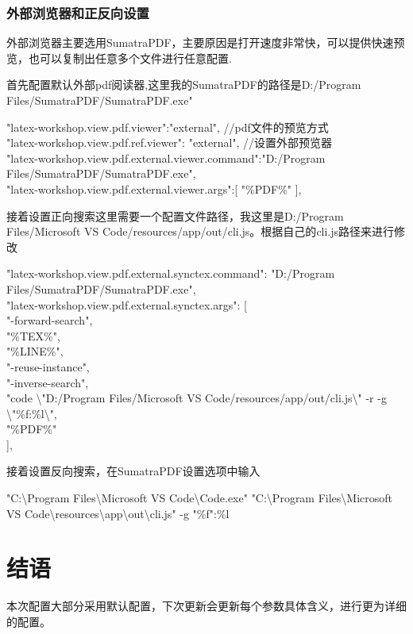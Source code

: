\documentclass[10pt, UTF8]{ctexart}%
\def\CodingInline#1{\colorbox{shadecolor}{\color{black}#1}}%
\def\CodingBlock#1{\begin{shaded} \noindent#1 \end{shaded}}
\begin{document}
        \subsubsection{外部浏览器和正反向设置}
        外部浏览器主要选用SumatraPDF，主要原因是打开速度非常快，可以提供快速预览，也可以复制出任意多个文件进行任意配置.
        
        首先配置默认外部pdf阅读器,这里我的SumatraPDF的路径是D:/Program Files/SumatraPDF/SumatraPDF.exe"
        \CodingBlock{"latex-workshop.view.pdf.viewer":"external",    //pdf文件的预览方式\\
        "latex-workshop.view.pdf.ref.viewer": "external",
        //设置外部预览器\\
        "latex-workshop.view.pdf.external.viewer.command":"D:/Program Files/SumatraPDF/SumatraPDF.exe",\\
        "latex-workshop.view.pdf.external.viewer.args":[
            "\%PDF\%"
        ],}
        接着设置正向搜索这里需要一个配置文件路径，我这里是D:/Program Files/Microsoft VS Code/resources/app/out/cli.js。根据自己的\CodingInline{cli.js}路径来进行修改
        \CodingBlock{"latex-workshop.view.pdf.external.synctex.command": "D:/Program Files/SumatraPDF/SumatraPDF.exe",\\
        "latex-workshop.view.pdf.external.synctex.args": [\\
          "-forward-search",\\
          "\%TEX\%",\\
          "\%LINE\%",\\
          "-reuse-instance",\\
          "-inverse-search",\\
          "code \textbackslash"D:/Program Files/Microsoft VS Code/resources/app/out/cli.js\textbackslash" -r -g \textbackslash"\%f:\%l\textbackslash",\\
          "\%PDF\%"\\
        ],}
        接着设置反向搜索，在SumatraPDF设置选项中输入
        \CodingBlock{"C:\textbackslash Program Files\textbackslash Microsoft VS Code\textbackslash Code.exe" "C:\textbackslash Program Files\textbackslash Microsoft VS Code\textbackslash resources\textbackslash app\textbackslash out\textbackslash cli.js" -g "\%f":\%l}

        \section{结语}
        本次配置大部分采用默认配置，下次更新会更新每个参数具体含义，进行更为详细的配置。
\end{document}
